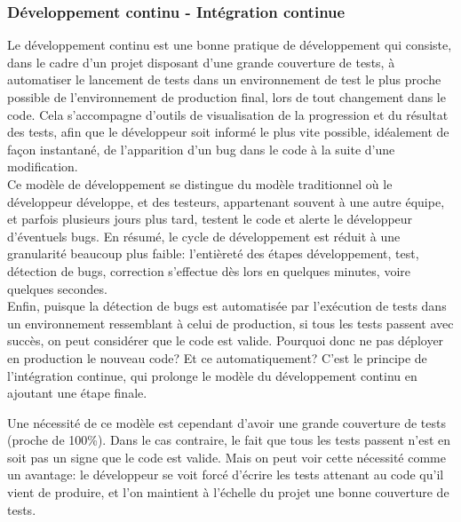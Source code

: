\documentclass[a4paper,french,12pt]{article}
\begin{document}
	\subsubsection{Développement continu - Intégration continue}
	Le développement continu est une bonne pratique de développement qui consiste, dans le cadre d'un projet disposant d'une grande couverture de tests, à automatiser le lancement de tests dans un environnement de test le plus proche possible de l'environnement de production final, lors de tout changement dans le code.
	Cela s'accompagne d'outils de visualisation de la progression et du résultat des tests, afin que le développeur soit informé le plus vite possible, idéalement de façon instantané, de l'apparition d'un bug dans le code à la suite d'une modification.~\\
	
	Ce modèle de développement se distingue du modèle traditionnel où le développeur développe, et des testeurs, appartenant souvent à une autre équipe, et parfois plusieurs jours plus tard, testent le code et alerte le développeur d'éventuels bugs. En résumé, le cycle de développement est réduit à une granularité beaucoup plus faible: l'entièreté des étapes développement, test, détection de bugs, correction s'effectue dès lors en quelques minutes, voire quelques secondes.~\\
	
	Enfin, puisque la détection de bugs est automatisée par l'exécution de tests dans un environnement ressemblant à celui de production, si tous les tests passent avec succès, on peut considérer que le code est valide. Pourquoi donc ne pas déployer en production le nouveau code? Et ce automatiquement? C'est le principe de l'intégration continue, qui prolonge le modèle du développement continu en ajoutant une étape finale.
		
	Une nécessité de ce modèle est cependant d'avoir une grande couverture de tests (proche de 100\%). Dans le cas contraire, le fait que tous les tests passent n'est en soit pas un signe que le code est valide. Mais on peut voir cette nécessité comme un avantage: le développeur se voit forcé d'écrire les tests attenant au code qu'il vient de produire, et l'on maintient à l'échelle du projet une bonne couverture de tests.~\\
	
\end{document}
